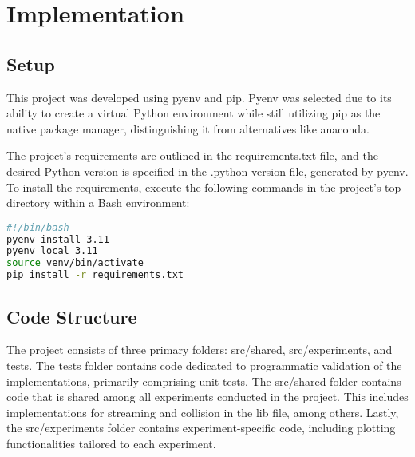 \chapter{Implementation}


\section{Setup}
This project was developed using pyenv and pip.
Pyenv was selected due to its ability to create a virtual Python environment while still utilizing pip as the native package manager, distinguishing it from alternatives like anaconda.
\newline

The project's requirements are outlined in the requirements.txt file, and the desired Python version is specified in the .python-version file, generated by pyenv.
To install the requirements, execute the following commands in the project's top directory within a Bash environment:

\begin{center}
    \begin{lstlisting}[language=bash]
#!/bin/bash
pyenv install 3.11
pyenv local 3.11
source venv/bin/activate
pip install -r requirements.txt
    \end{lstlisting}
\end{center}


\section{Code Structure}
The project consists of three primary folders: src/shared, src/experiments, and tests.
The tests folder contains code dedicated to programmatic validation of the implementations, primarily comprising unit tests.
The src/shared folder contains code that is shared among all experiments conducted in the project.
This includes implementations for streaming and collision in the lib file, among others.
Lastly, the src/experiments folder contains experiment-specific code, including plotting functionalities tailored to each experiment.
